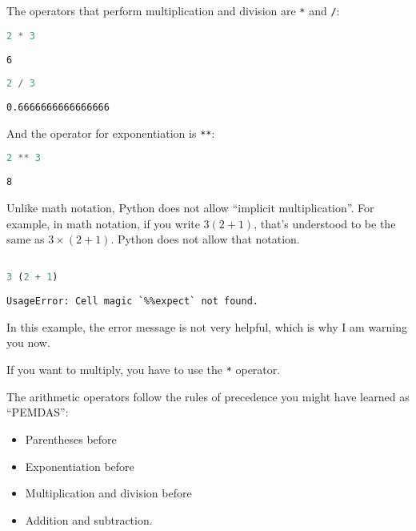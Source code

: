 The operators that perform multiplication and division are
\passthrough{\lstinline!*!} and \passthrough{\lstinline!/!}:

\begin{lstlisting}[language=Python,style=source]
2 * 3
\end{lstlisting}

\begin{lstlisting}[style=output]
6
\end{lstlisting}

\begin{lstlisting}[language=Python,style=source]
2 / 3
\end{lstlisting}

\begin{lstlisting}[style=output]
0.6666666666666666
\end{lstlisting}

And the operator for exponentiation is \passthrough{\lstinline!**!}:

\begin{lstlisting}[language=Python,style=source]
2 ** 3
\end{lstlisting}

\begin{lstlisting}[style=output]
8
\end{lstlisting}

Unlike math notation, Python does not allow ``implicit multiplication''.
For example, in math notation, if you write \(3 (2 + 1)\), that's
understood to be the same as \(3 \times (2+ 1)\). Python does not allow
that notation.

\begin{lstlisting}[language=Python,style=source]
%%expect TypeError

3 (2 + 1)
\end{lstlisting}

\begin{lstlisting}[style=output]
UsageError: Cell magic `%%expect` not found.
\end{lstlisting}

In this example, the error message is not very helpful, which is why I
am warning you now.

If you want to multiply, you have to use the \passthrough{\lstinline!*!}
operator.

The arithmetic operators follow the rules of precedence you might have
learned as ``PEMDAS'':

\begin{itemize}

\item
  Parentheses before
\item
  Exponentiation before
\item
  Multiplication and division before
\item
  Addition and subtraction.
\end{itemize}

